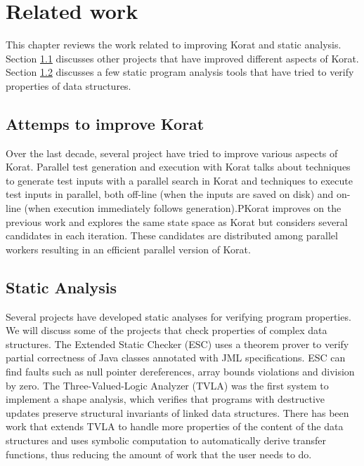 \chapter{Related work}
\label{ch:related-work}
This chapter reviews the work related to improving Korat and static analysis. Section \ref{sec:attempts-to-improve-korat} discusses other projects that have improved different aspects of Korat. Section \ref{sec:related-static-analyses} discusses a few static program analysis tools that have tried to verify properties of data structures.

\section{Attemps to improve Korat}
\label{sec:attempts-to-improve-korat}
Over the last decade, several project have tried to improve various
aspects of Korat. Parallel test generation and execution with Korat
\cite{...} talks about techniques to generate test inputs with a
parallel search in Korat and techniques to execute test inputs in
parallel, both off-line (when the inputs are saved on disk) and
on-line (when execution immediately follows generation).PKorat
\cite{...} improves on the previous work and explores the same state
space as Korat but considers several candidates in each
iteration. These candidates are distributed among parallel workers
resulting in an efficient parallel version of Korat.





\section{Static Analysis}
\label{sec:related-static-analyses}
Several projects have developed static analyses for verifying program
properties. We will discuss some of the projects that check properties
of complex data structures. The Extended Static Checker (ESC)
\cite{flanagan2002extended} uses a theorem prover to verify partial correctness of Java
classes annotated with JML specifications. ESC can find faults such as
null pointer dereferences, array bounds violations and division by
zero. The Three-Valued-Logic Analyzer (TVLA) \cite{sagiv2002parametric} was the first
system to implement a shape analysis, which verifies that programs
with destructive updates preserve structural invariants of linked data
structures. There has been work \cite{yorsh2004symbolically}  that extends TVLA to
handle more properties of the content of the data structures and uses
symbolic computation to automatically derive transfer functions, thus
reducing the amount of work that the user needs to do.

